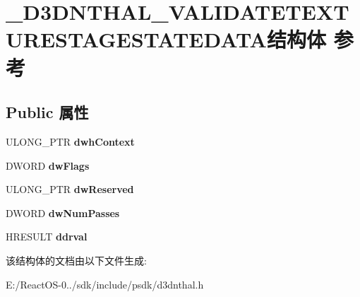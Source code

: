 \hypertarget{struct___d3_d_n_t_h_a_l___v_a_l_i_d_a_t_e_t_e_x_t_u_r_e_s_t_a_g_e_s_t_a_t_e_d_a_t_a}{}\section{\+\_\+\+D3\+D\+N\+T\+H\+A\+L\+\_\+\+V\+A\+L\+I\+D\+A\+T\+E\+T\+E\+X\+T\+U\+R\+E\+S\+T\+A\+G\+E\+S\+T\+A\+T\+E\+D\+A\+T\+A结构体 参考}
\label{struct___d3_d_n_t_h_a_l___v_a_l_i_d_a_t_e_t_e_x_t_u_r_e_s_t_a_g_e_s_t_a_t_e_d_a_t_a}
\subsection*{Public 属性}
\begin{DoxyCompactItemize}
\item 
\mbox{\label{struct___d3_d_n_t_h_a_l___v_a_l_i_d_a_t_e_t_e_x_t_u_r_e_s_t_a_g_e_s_t_a_t_e_d_a_t_a_a22e211f9f58ce20955d1415f2bfc724c}} 
U\+L\+O\+N\+G\+\_\+\+P\+TR {\bfseries dwh\+Context}
\item 
\mbox{\label{struct___d3_d_n_t_h_a_l___v_a_l_i_d_a_t_e_t_e_x_t_u_r_e_s_t_a_g_e_s_t_a_t_e_d_a_t_a_a910a2cb8ef245f6c10d4938560259d92}} 
D\+W\+O\+RD {\bfseries dw\+Flags}
\item 
\mbox{\label{struct___d3_d_n_t_h_a_l___v_a_l_i_d_a_t_e_t_e_x_t_u_r_e_s_t_a_g_e_s_t_a_t_e_d_a_t_a_a5647c8ebf74fa4b55aca19bf0e682815}} 
U\+L\+O\+N\+G\+\_\+\+P\+TR {\bfseries dw\+Reserved}
\item 
\mbox{\label{struct___d3_d_n_t_h_a_l___v_a_l_i_d_a_t_e_t_e_x_t_u_r_e_s_t_a_g_e_s_t_a_t_e_d_a_t_a_a3a80d1eb77490d3b4293503a87504396}} 
D\+W\+O\+RD {\bfseries dw\+Num\+Passes}
\item 
\mbox{\label{struct___d3_d_n_t_h_a_l___v_a_l_i_d_a_t_e_t_e_x_t_u_r_e_s_t_a_g_e_s_t_a_t_e_d_a_t_a_ae363b55c2ca836d94106d5aac8d14d32}} 
H\+R\+E\+S\+U\+LT {\bfseries ddrval}
\end{DoxyCompactItemize}


该结构体的文档由以下文件生成\+:\begin{DoxyCompactItemize}
\item 
E\+:/\+React\+O\+S-\/0../sdk/include/psdk/d3dnthal.\+h\end{DoxyCompactItemize}
